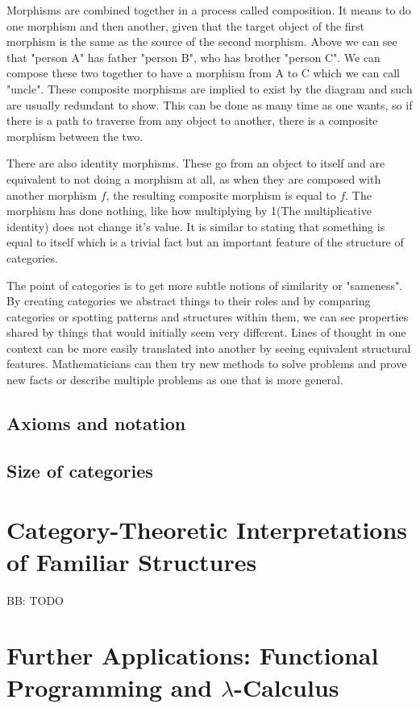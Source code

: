 \documentclass[10pt,a4paper]{amsart}
\begin{document}
Morphisms are combined together in a process called composition.
It means to do one morphism and then another, given that the target object of the first morphism is the same as the source of the second morphism.
Above we can see that "person A" has father "person B", who has brother "person C".
We can compose these two together to have a morphism from A to C which we can call "uncle".
These composite morphisms are implied to exist by the diagram and such are usually redundant to show.
This can be done as many time as one wants, so if there is a path to traverse from any object to another, there is a composite morphism between the two.

There are also identity morphisms.
These go from an object to itself and are equivalent to not doing a morphism at all,
as when they are composed with another morphism $f$, the resulting composite morphism is equal to $f$.
The morphism has done nothing, like how multiplying by 1(The multiplicative identity) does not change it's value.
It is similar to stating that something is equal to itself which is a trivial fact but an important feature of the structure of categories.

The point of categories is to get more subtle notions of similarity or "sameness".
By creating categories we abstract things to their roles and by comparing categories or spotting patterns and structures within them,
we can see properties shared by things that would initially seem very different.
Lines of thought in one context can be more easily translated into another by seeing equivalent structural features.
Mathematicians can then try new methods to solve problems and prove new facts or describe multiple problems as one that is more general.
\subsection{Axioms and notation}
\subsection{Size of categories}

\section{Category-Theoretic %
        Interpretations of Familiar Structures}
BB: TODO

\section{Further Applications: %
        Functional Programming and \texorpdfstring{$\lambda$}{Lambda}-Calculus}
\end{document}
